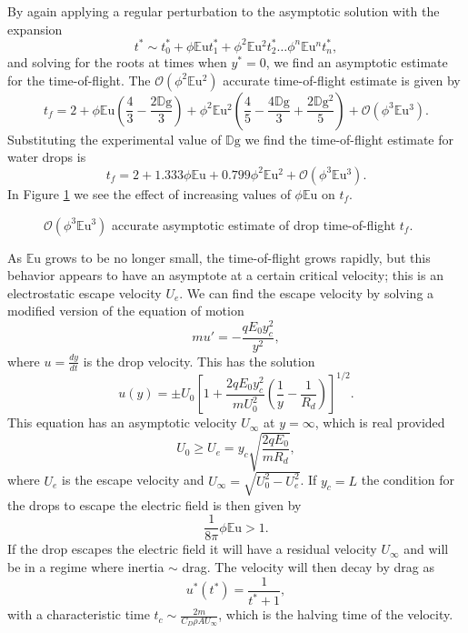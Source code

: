 \documentclass[12pt,a4paper,oneside]{book}
\begin{document}
By again applying a regular perturbation to the asymptotic solution with the expansion
\[ t^* \sim t^*_0 + \phi \mathbb{E}\mbox{u} t^*_1 + \phi^2 \mathbb{E}\mbox{u}^2 t^*_2 \ldots \phi^n \mathbb{E}\mbox{u}^n t^*_n  
,\]
and solving for the roots at times when $y^* = 0$, we find an asymptotic estimate for the time-of-flight. The $\mathcal{O}(\phi^2 \mathbb{E}\mbox{u}^2)$ accurate time-of-flight estimate is given by
\[t_f = 2 + \phi \mathbb{E}\mbox{u} \left(\frac{4}{3} - \frac{2 \mathbb{D}\mbox{g}}{3}\right) + \phi^2 \mathbb{E}\mbox{u}^{2} \left(\frac{4}{5} - \frac{4 \mathbb{D}\mbox{g}}{3} + \frac{2 \mathbb{D}\mbox{g}^{2}}{5}\right) + \mathcal{O}(\phi^3 \mathbb{E}\mbox{u}^3).\]
Substituting the experimental value of $\mathbb{D}\mbox{g}$ we find the time-of-flight estimate for water drops is
\begin{equation} \label{time_of_flight}
t_f = 2 + 1.333 \phi \mathbb{E}\mbox{u} + 0.799 \phi^2 \mathbb{E}\mbox{u}^{2} + \mathcal{O}(\phi^3 \mathbb{E}\mbox{u}^3). 
\end{equation} 
In Figure \ref{fig:drag} we see the effect of increasing values of $\phi \mathbb{E}\mbox{u}$ on $t_f$.
\begin{figure}[htb]
    \centering
    
    \caption{$\mathcal{O}(\phi^3 \mathbb{E}\mbox{u}^3)$ accurate asymptotic estimate of drop time-of-flight $t_f$.}
    \label{fig:drag}
\end{figure}
As $\mathbb{E}\mbox{u}$ grows to be no longer small, the time-of-flight grows rapidly, but this behavior appears to have an asymptote at a certain critical velocity; this is an electrostatic escape velocity $U_e$. We can find the escape velocity by solving a modified version of the equation of motion
\[ m u' = - \frac{q E_0 y_c^2}{y^2}, \]
where $u = \frac{d y}{d t}$ is the drop velocity. This has the solution
\[ u(y) = \pm U_0 \left[1 + \frac{2q E_0 y_c^2}{m U_0^2} \left( \frac{1}{y} - \frac{1}{R_d} \right) \right]^{1/2}.
\]
This equation has an asymptotic velocity $U_{\infty}$ at $y = \infty$, which is real provided 
\[ U_0 \geq  U_e = y_c \sqrt{\frac{2 q E_0 }{m R_d}},
\]
where $U_e$ is the escape velocity and $U_{\infty} = \sqrt{U_0^2 - U_e^2}$. If $y_c=L$ the condition for the drops to escape the electric field is then given by
\begin{equation}\label{escape}
\frac{1}{8 \pi} \phi \mathbb{E}\mbox{u} > 1.
\end{equation}
If the drop escapes the electric field it will have a residual velocity $U_{\infty}$ and will be in a regime where inertia $\sim$ drag. The velocity will then decay by drag as
\[
u^*(t^*) = \frac{1}{t^* + 1},
\]
with a characteristic time $t_c \sim \frac{2 m}{C_D \rho A U_{\infty}}$, which is the halving time of the velocity.
\end{document}
